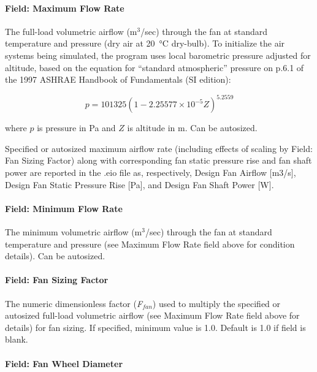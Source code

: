 \paragraph{Field: Maximum Flow Rate}\label{field-maximum-flow-rate-5}

The full-load volumetric airflow (m\(^{3}\)/sec) through the fan at standard temperature and pressure (dry air at \SI{20}{\celsius} dry-bulb). To initialize the air systems being simulated, the program uses local barometric pressure adjusted for altitude, based on the equation for ``standard atmospheric'' pressure on p.6.1 of the 1997 ASHRAE Handbook of Fundamentals (SI edition):

\begin{equation}
p = 101325 \left(1 - 2.25577 \times 10^{-5} Z\right)^{5.2559}
\end{equation}

where \(p\) is pressure in Pa and \(Z\) is altitude in m. Can be autosized.

Specified or autosized maximum airflow rate (including effects of scaling by Field: Fan Sizing Factor) along with corresponding fan static pressure rise and fan shaft power are reported in the .eio file as, respectively, Design Fan Airflow {[}m3/s{]}, Design Fan Static Pressure Rise {[}Pa{]}, and Design Fan Shaft Power {[}W{]}.

\paragraph{Field: Minimum Flow Rate}\label{field-minimum-flow-rate}

The minimum volumetric airflow (m\(^{3}\)/sec) through the fan at standard temperature and pressure (see Maximum Flow Rate field above for condition details). Can be autosized.

\paragraph{Field: Fan Sizing Factor}\label{field-fan-sizing-factor}

The numeric dimensionless factor (\emph{F\(_{fan}\)}) used to multiply the specified or autosized full-load volumetric airflow (see Maximum Flow Rate field above for details) for fan sizing. If specified, minimum value is 1.0. Default is 1.0 if field is blank.

\paragraph{Field: Fan Wheel Diameter}\label{field-fan-wheel-diameter}

